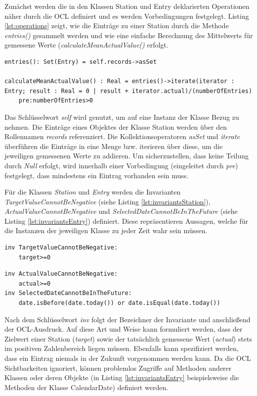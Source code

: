 \documentclass[a4paper,twoside]{article}
\begin{document}
Zunächst werden die in den Klassen Station und Entry deklarierten Operationen näher durch die OCL definiert und es werden Vorbedingungen festgelegt. Listing \ref{lst:operations} zeigt, wie die Einträge zu einer Station durch die Methode \textit{entries()} gesammelt werden und wie eine einfache Berechnung des Mittelwerts für gemessene Werte (\textit{calculateMeanActualValue()} erfolgt.  
\begin{lstlisting}[caption={OCL-erweiterte Operationen der Klasse Station},label=lst:operations]
entries(): Set(Entry) = self.records->asSet

calculateMeanActualValue() : Real = entries()->iterate(iterator : Entry; result : Real = 0 | result + iterator.actual)/(numberOfEntries) 
	pre:numberOfEntries>0
\end{lstlisting}
Das Schlüsselwort \textit{self} wird genutzt, um auf eine Instanz der Klasse Bezug zu nehmen. Die Einträge eines Objektes der Klasse Station werden über den Rollennamen \textit{records} referenziert. Die Kollektionsoperatoren \textit{asSet} und \textit{iterate} überführen die Einträge in eine Menge bzw. iterieren über diese, um die jeweiligen gemessenen Werte zu addieren. Um sicherzustellen, dass keine Teilung durch \textit{Null} erfolgt, wird innerhalb einer Vorbedingung (eingeleitet durch \textit{pre}) festgelegt, dass mindestens ein Eintrag vorhanden sein muss. 

Für die Klassen \textit{Station} und \textit{Entry} werden die Invarianten \textit{TargetValueCannotBeNegative} (siehe Listing \ref{lst:invariantsStation}), \textit{ActualValueCannotBeNegative} und \textit{SelectedDateCannotBeInTheFuture} (siehe Listing \ref{lst:invariantsEntry}) definiert. Diese repräsentieren Aussagen, welche für die Instanzen der jeweiligen Klasse zu jeder Zeit wahr sein müssen. \cite[S.188]{OCLFormal}

\begin{lstlisting}[caption={Invariante in der Klasse Station},label=lst:invariantsStation]
inv TargetValueCannotBeNegative:
	target>=0
\end{lstlisting}
\begin{lstlisting}[caption={Invarianten in der Klasse Entry},label=lst:invariantsEntry]
inv ActualValueCannotBeNegative:
	actual>=0
inv SelectedDateCannotBeInTheFuture:
	date.isBefore(date.today()) or date.isEqual(date.today())
\end{lstlisting}

Nach dem Schlüsselwort \textit{inv} folgt der Bezeichner der Invariante und anschließend der OCL-Ausdruck. Auf diese Art und Weise kann formuliert werden, dass der Zielwert einer Station (\textit{target}) sowie der tatsächlich gemessene Wert (\textit{actual}) stets im positiven Zahlenbereich liegen müssen. Ebenfalls kann spezifiziert werden, dass ein Eintrag niemals in der Zukunft vorgenommen werden kann. Da die OCL Sichtbarkeiten ignoriert, können problemlos Zugriffe auf Methoden anderer Klassen oder deren Objekte (in Listing \ref{lst:invariantsEntry} beispielsweise die Methoden der Klasse CalendarDate) definiert werden. \cite[S.71]{OCLFormal}
\\
\end{document}
